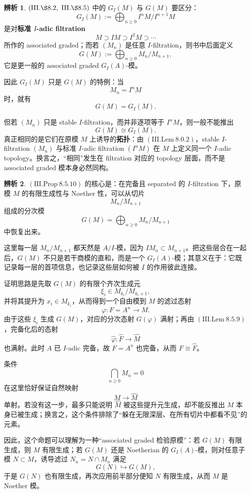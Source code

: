 \documentclass[a4paper]{ctexart}
\theoremstyle{definition}
\theoremstyle{analysis}
\newtheorem{remark}{辨析}[section]
\theoremstyle{plain}
\begin{document}
\begin{remark}
\label{rem:giM-vs-gM}
\((\mathrm{III.\S 8.2},\ \mathrm{III.\S 8.5})\) 中的 \(G_I(M)\) 与 \(G(M)\) 要区分：
\[
  G_I(M):=\bigoplus_{n\ge 0} I^nM/I^{n+1}M
\]
是对\textbf{标准 \(I\)-adic filtration}
\[
  M\supset IM\supset I^2M\supset \cdots
\]
所作的 associated graded；而若 \((M_n)\) 是任意 \(I\)-filtration，则书中后面定义
\[
  G(M):=\bigoplus_{n\ge 0} M_n/M_{n+1},
\]
它是更一般的 associated graded \(G_I(A)\)-模。

因此 \(G_I(M)\) 只是 \(G(M)\) 的特例：当
\[
  M_n=I^nM
\]
时，就有
\[
  G(M)=G_I(M).
\]

但若 \((M_n)\) 只是 stable \(I\)-filtration，而并非逐项等于 \(I^nM\)，则一般不能推出
\[
  G(M)\cong G_I(M).
\]
真正相同的是它们在原模 \(M\) 上诱导的\textbf{拓扑}：由 \((\mathrm{III.Lem}\ 8.0.2)\)，stable \(I\)-filtration \((M_n)\) 与标准 \(I\)-adic filtration \((I^nM)\) 在 \(M\) 上定义同一个 \(I\)-adic topology。换言之，“相同”发生在 filtration 对应的 topology 层面，而不是 associated graded 模本身必然同构。
\end{remark}

\begin{remark}
\label{rem:prop8510-graded-recovery}
\((\mathrm{III.Prop}\ 8.5.10)\) 的核心是：在完备且 separated 的 \(I\)-filtration 下，原模 \(M\) 的有限生成性与 Noether 性，可以从切片
\[
  M_n/M_{n+1}
\]
组成的分次模
\[
  G(M)=\bigoplus_{n\ge 0} M_n/M_{n+1}
\]
中恢复出来。

这里每一层 \(M_n/M_{n+1}\) 都天然是 \(A/I\)-模，因为 \(IM_n\subset M_{n+1}\)。把这些层合在一起后，\(G(M)\) 不只是若干商模的直和，而是一个 \(G_I(A)\)-模；其意义在于：它既记录每一层的首项信息，也记录这些层如何被 \(I\) 的作用彼此连接。

证明思路是先取 \(G(M)\) 的有限个齐次生成元
\[
  \xi_i\in M_{k_i}/M_{k_i+1},
\]
并将其提升为 \(x_i\in M_{k_i}\)，从而得到一个自由模到 \(M\) 的滤过态射
\[
  \varphi:F=A^n\to M.
\]
由于这些 \(\xi_i\) 生成 \(G(M)\)，对应的分次态射 \(G(\varphi)\) 满射；再由 \((\mathrm{III.Lem}\ 8.5.9)\)，完备化后的态射
\[
  \widehat\varphi:\widehat F\to \widehat M
\]
也满射。此时 \(A\) 已 \(I\)-adic 完备，故 \(F=A^n\) 也完备，从而 \(F\cong \widehat F\)。

条件
\[
  \bigcap_{n\ge 0} M_n=0
\]
在这里恰好保证自然映射
\[
  M\to \widehat M
\]
单射。若没有这一步，最多只能说明 \(\widehat M\) 被这些提升元生成，却不能反推出 \(M\) 本身已被生成；换言之，这个条件排除了“躲在无限深层、在所有切片中都看不见”的元素。

因此，这个命题可以理解为一种“associated graded 检验原模”：若 \(G(M)\) 有限生成，则 \(M\) 有限生成；若 \(G(M)\) 还是 Noetherian 的 \(G_I(A)\)-模，则对任意子模 \(N\subset M\)，诱导滤过 \(N_n=N\cap M_n\) 满足
\[
  G(N)\hookrightarrow G(M),
\]
于是 \(G(N)\) 也有限生成，再次应用前半部分便知 \(N\) 有限生成，从而 \(M\) 是 Noether 模。
\end{remark}
\end{document}
